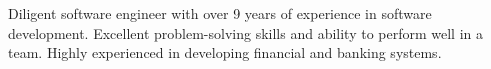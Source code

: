 

\begin{cvparagraph}

    Diligent software engineer with over 9 years of experience in software development.
    Excellent problem-solving skills and ability to perform well in a team.
    Highly experienced in developing financial and banking systems.
\end{cvparagraph}
